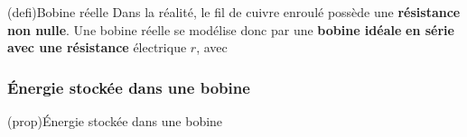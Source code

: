 \documentclass[../../main/main.tex]{subfiles}
\begin{document}
\begin{tcb*}[sidebyside, righthand ratio=.3](defi){Bobine réelle}
	Dans la réalité, le fil de cuivre enroulé possède une \textbf{résistance non
		nulle}. Une bobine réelle se modélise donc par une \textbf{bobine idéale}
	\textbf{en série avec une résistance} électrique $r$, avec
	\vspace{-15pt}
	\tcblower
	\begin{center}
		\vspace{-15pt}
		\label{fig:breel}
	\end{center}
\end{tcb*}

\subsubsection{Énergie stockée dans une bobine}
\begin{tcb*}[label=prop:El](prop){Énergie stockée dans une bobine}
	\psw{%
		\[
			\boxed{\Ec_L(t) = \frac{1}{2}L i{}^2(t)}
		\]
	}%
	\vspace{-10pt}
\end{tcb*}
\end{document}
